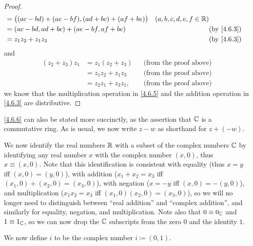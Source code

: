 \begin{proof}
\begin{align*}
                    & = \big((ac - bd) + (ae - bf), (ad + bc) + (af + be) \big) & (a, b, c, d, e, f \in \R)              \\
                    & = (ac - bd, ad + bc) + (ae - bf, af + be)                 &                           & \by{4.6.3} \\
                    & = z_1 z_2 + z_1 z_3                                       &                           & \by{4.6.3}
  \end{align*}
  and
  \begin{align*}
    (z_2 + z_3) z_1 & = z_1 (z_2 + z_3)    &  & \text{(from the proof above)} \\
                    & = z_1 z_2 + z_1 z_3  &  & \text{(from the proof above)} \\
                    & = z_2 z_1 + z_3 z_1, &  & \text{(from the proof above)}
  \end{align*}
  we know that the multiplication operation in \cref{4.6.5} and the addition operation in \cref{4.6.3} are distributive.
\end{proof}

\begin{note}
  \cref{4.6.6} can also be stated more succinctly, as the assertion that \(\mathbb{C}\) is a commutative ring.
  As is usual, we now write \(z - w\) as shorthand for \(z + (-w)\).
\end{note}

\begin{note}
  We now identify the real numbers \(\mathbb{R}\) with a subset of the complex numbers \(\mathbb{C}\) by identifying any real number \(x\) with the complex number \((x, 0)\), thus \(x \equiv (x, 0)\).
  Note that this identification is consistent with equality (thus \(x = y\) iff \((x, 0) = (y, 0)\)), with addition (\(x_1 + x_2 = x_3\) iff \((x_1, 0) + (x_2, 0) = (x_3, 0)\)), with negation (\(x = -y\) iff \((x, 0) = -(y, 0)\)), and multiplication (\(x_1 x_2 = x_3\) iff \((x_1, 0) (x_2, 0) = (x_3, 0)\)), so we will no longer need to distinguish between ``real addition'' and ``complex addition'', and similarly for equality, negation, and multiplication.
  Note also that \(0 \equiv 0_{\mathbb{C}}\) and \(1 \equiv 1_{\mathbb{C}}\), so we can now drop the \(\mathbb{C}\) subscripts from the zero \(0\) and the identity \(1\).
\end{note}

\begin{note}
  We now define \(i\) to be the complex number \(i \coloneqq (0, 1)\).
\end{note}

